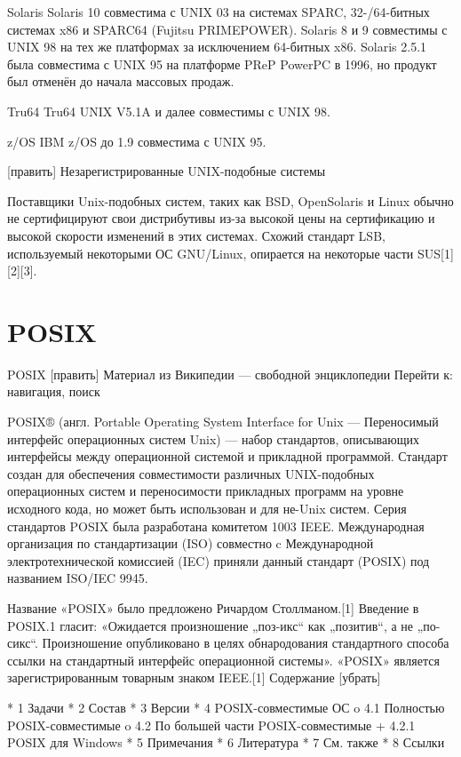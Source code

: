 Solaris
    Solaris 10 совместима с UNIX 03 на системах SPARC, 32-/64-битных системах x86 и SPARC64 (Fujitsu PRIMEPOWER). Solaris 8 и 9 совместимы с UNIX 98 на тех же платформах за исключением 64-битных x86. Solaris 2.5.1 была совместима с UNIX 95 на платформе PReP PowerPC в 1996, но продукт был отменён до начала массовых продаж.

Tru64
    Tru64 UNIX V5.1A и далее совместимы с UNIX 98.

z/OS
    IBM z/OS до 1.9 совместима с UNIX 95.

[править] Незарегистрированные UNIX-подобные системы

Поставщики Unix-подобных систем, таких как BSD, OpenSolaris и Linux обычно не сертифицируют свои дистрибутивы из-за высокой цены на сертификацию и высокой скорости изменений в этих системах. Схожий стандарт LSB, используемый некоторыми ОС GNU/Linux, опирается на некоторые части SUS[1][2][3].
\section{POSIX}
POSIX
[править]
Материал из Википедии — свободной энциклопедии
Перейти к: навигация, поиск

POSIX® (англ. Portable Operating System Interface for Unix — Переносимый интерфейс операционных систем Unix) — набор стандартов, описывающих интерфейсы между операционной системой и прикладной программой. Стандарт создан для обеспечения совместимости различных UNIX-подобных операционных систем и переносимости прикладных программ на уровне исходного кода, но может быть использован и для не-Unix систем. Серия стандартов POSIX была разработана комитетом 1003 IEEE. Международная организация по стандартизации (ISO) совместно c Международной электротехнической комиссией (IEC) приняли данный стандарт (POSIX) под названием ISO/IEC 9945.

Название «POSIX» было предложено Ричардом Столлманом.[1] Введение в POSIX.1 гласит: «Ожидается произношение „поз-икс“ как „позитив“, а не „по-сикс“. Произношение опубликовано в целях обнародования стандартного способа ссылки на стандартный интерфейс операционной системы». «POSIX» является зарегистрированным товарным знаком IEEE.[1]
Содержание
[убрать]

    * 1 Задачи
    * 2 Состав
    * 3 Версии
    * 4 POSIX-совместимые ОС
          o 4.1 Полностью POSIX-совместимые
          o 4.2 По большей части POSIX-совместимые
                + 4.2.1 POSIX для Windows
    * 5 Примечания
    * 6 Литература
    * 7 См. также
    * 8 Ссылки

